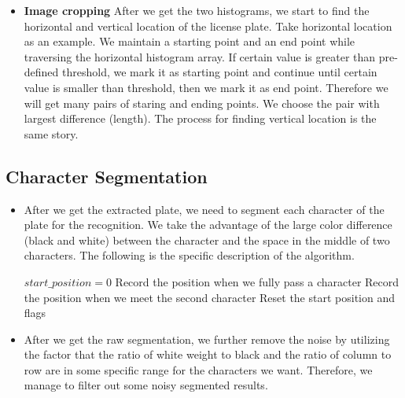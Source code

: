\documentclass{article}
\begin{document}
\begin{spacing}{1.0}
\begin{itemize}
	\item \textbf{Image cropping} After we get the two histograms, we start to find the horizontal and vertical location of the license plate. Take horizontal location as an example. We maintain a starting point and an end point while traversing the horizontal histogram array. If certain value is greater than pre-defined threshold, we mark it as starting point and continue until certain value is smaller than threshold, then we mark it as end point. Therefore we will get many pairs of staring and ending points. We choose the pair with largest difference (length). The process for finding vertical location is the same story. 
	
\end{itemize}

\subsection{Character Segmentation}
\begin{itemize}
	\item After we get the extracted plate, we need to segment each character of the plate for the recognition. We take the advantage of the large color difference (black and white) between the character and the space in the middle of two characters. The following is the specific description of the algorithm. 
	\begin{algorithm}
	
		\begin{algorithmic}[1]
			\State $start\_position = 0$
			\State Record the position when we fully pass a character
			\State Record the position when we meet the second character
			\State Reset the start position and flags
			\EndFor
		
			\EndProcedure
		\end{algorithmic}
	\end{algorithm}
 \item After we get the raw segmentation, we further remove the noise by utilizing the factor that the ratio of white weight to black and the ratio of column to row are in some specific range for the characters we want. Therefore, we manage to filter out some noisy segmented results.
\end{itemize}


\end{spacing}
\end{document}
